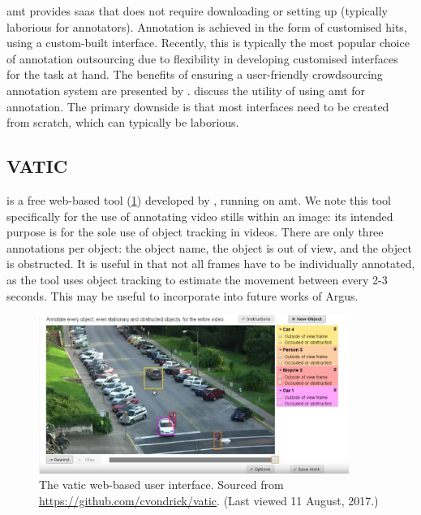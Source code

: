 \gls{amt} provides \gls{saas} that does not require downloading or setting up (typically laborious for annotators). Annotation is achieved in the form of customised \glspl{hit}, using a custom-built interface. Recently, this is typically the most popular choice of annotation outsourcing \citep{Lin:2014vma,Veit:2016vj,Chen:2015ur,JiaDeng:2009dl,Netzer:2011to} due to flexibility in developing customised interfaces for the task at hand. The benefits of ensuring a user-friendly crowdsourcing annotation system are presented by \citet{Matera:2014wq}. \citet{Sorokin:2008uk} discuss the utility of using \gls{amt} for annotation. The primary downside is that most interfaces need to be created from scratch, which can typically be laborious.

\subsection{VATIC}

 is a free web-based tool (\cref{fig:dataset:architecture_evaluation:tools:vatic}) developed by \citet{springerlink:10.1007/s11263-012-0564-1}, running on \gls{amt}. We note this tool specifically for the use of annotating video stills within an image: its intended purpose is for the sole use of object tracking in videos. There are only three annotations per object: the object name, the object is out of view, and the object is obstructed. It is useful in that not all frames have to be individually annotated, as the tool uses object tracking to estimate the movement between every 2-3 seconds. This may be useful to incorporate into future works of Argus. 

\begin{figure}[h]
  \centering
  \includegraphics[width=0.9\textwidth]{images/dataset/tools/vatic}
  \caption[The VATIC web-based user interface]{The \gls{vatic} web-based user interface. Sourced from \url{https://github.com/cvondrick/vatic}. (Last viewed 11 August, 2017.)}
  \label{fig:dataset:architecture_evaluation:tools:vatic}
\end{figure}

